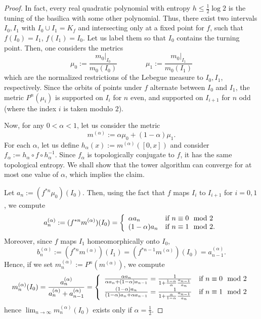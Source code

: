 \documentclass[11pt]{amsart}
\begin{document}
\begin{proof}
In fact, every real quadratic polynomial with entropy $h \leq \frac{1}{2} \log 2$ is the tuning of the basilica with some other polynomial. 
Thus, there exist two intervals $I_0, I_1$ with $I_0 \cup I_1 = K_f$ and intersecting only at a fixed point for $f$, such that  $f(I_0) = I_1$, $f(I_1) = I_0$. Let us label them so that $I_0$ contains the turning point. Then, one considers the metrics 
$$\mu_0 := \frac{m_0 \vert_{I_0}}{m_0(I_0)} \qquad \qquad \mu_1 := \frac{m_0 \vert_{I_1}}{m_0(I_1)}$$
which are the normalized restrictions of the Lebegue measure to $I_0, I_1$, respectively. 
Since the orbits of points under $f$ alternate between $I_0$ and $I_1$, the metric $P^n(\mu_i)$ is supported on $I_i$ for $n$ even, and supported on $I_{i+1}$ for $n$ odd 
(where the index $i$ is taken modulo $2$).


Now, for any $0 < \alpha < 1$, let us consider the metric
$$m^{(\alpha)} := \alpha \mu_0 + (1- \alpha) \mu_1.$$
For each $\alpha$, let us define $h_\alpha(x) := m^{(\alpha)}([0, x])$ and consider 
$f_\alpha := h_\alpha \circ f \circ h_\alpha^{-1}$.
Since $f_\alpha$ is topologically conjugate to $f$, it has the same topological entropy. 
We shall show that the tower algorithm can converge for at most one value of $\alpha$, which implies the claim. 


Let $a_n := (f^{*n} \mu_0)(I_0)$.  Then, using the fact that $f$ maps $I_i$ to $I_{i+1}$ for $i = 0, 1$, we compute 
$$a_n^{(\alpha)} := (f^{*n} m^{(\alpha)})(I_0) =  \left\{ \begin{array}{ll} 
\alpha a_n & \textup{if }n \equiv 0 \mod 2 \\
(1-\alpha) a_n & \textup{if }n \equiv 1 \mod 2 .
\end{array} \right.$$
Moreover, since $f$ maps $I_1$ homeomorphically onto $I_0$, 
$$b_n^{(\alpha)} := (f^{*n} m^{(\alpha)} )(I_1) = (f^{*n-1} m^{(\alpha)} )(I_0) = a_{n-1}^{(\alpha)}.$$
Hence, if we set $m_n^{(\alpha)} := P^n(m^{(\alpha)})$, we compute 
$$m^{(\alpha)}_n(I_0) = \frac{a_n^{(\alpha)}}{a_n^{(\alpha)} + a_{n-1}^{(\alpha)}} = 
\left\{ \begin{array}{ll} \frac{\alpha a_n}{ \alpha a_n + (1-\alpha) a_{n-1}}  = \frac{1}{1 + \frac{1-\alpha}{\alpha} \frac{a_{n-1}}{a_n}}  & \textup{if }n \equiv 0 \mod 2 \\ 
\frac{(1-\alpha) a_n}{(1-\alpha) a_n + \alpha a_{n-1}}  =  \frac{1}{1 + \frac{\alpha}{1-\alpha} \frac{a_{n-1}}{a_n}} & \textup{if }n \equiv 1 \mod 2
\end{array}\right.$$
hence 
$\lim_{n \to \infty} m^{(\alpha)}_n(I_0)$ exists only if $\alpha = \frac{1}{2}$. 


\end{proof}
\end{document}

